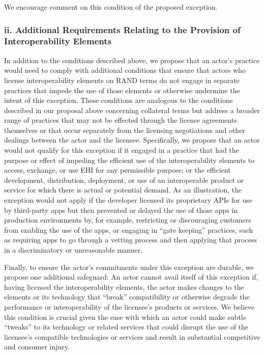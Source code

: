 \documentclass[twoside,11pt]{article}
\begin{document}
          We encourage comment on this condition of the proposed exception.


          \subsubsection{ii. Additional Requirements Relating to the Provision of Interoperability Elements}


          In addition to the conditions described above, we propose that an actor's practice would need to comply with additional conditions that ensure that actors who license interoperability elements on RAND terms do not engage in separate practices that impede the use of those elements or otherwise undermine the intent of this exception. These conditions are analogous to the conditions described in our proposal above concerning collateral terms but address a broader range of practices that may not be effected through the license agreements themselves or that occur separately from the licensing negotiations and other dealings between the actor and the licensee. Specifically, we propose that an actor would not qualify for this exception if it engaged in a practice that had the purpose or  \ifhmode\expandafter\xspace\fi effect of impeding the efficient use of the interoperability elements to access, exchange, or use EHI for any permissible purpose; or the efficient development, distribution, deployment, or use of an interoperable product or service for which there is actual or potential demand. As an illustration, the exception would not apply if the developer licensed its proprietary APIs for use by third-party apps but then prevented or delayed the use of those apps in production environments by, for example, restricting or discouraging customers from enabling the use of the apps, or engaging in “gate keeping” practices, such as requiring apps to go through a vetting process and then applying that process in a discriminatory or unreasonable manner.


          Finally, to ensure the actor's commitments under this exception are durable, we propose one additional safeguard: An actor cannot avail itself of this exception if, having licensed the interoperability elements, the actor makes changes to the elements or its technology that “break” compatibility or otherwise degrade the performance or interoperability of the licensee's products or services. We believe this condition is crucial given the ease with which an actor could make subtle “tweaks” to its technology or related services that could disrupt the use of the licensee's compatible technologies or services and result in substantial competitive and consumer injury.
\end{document}
